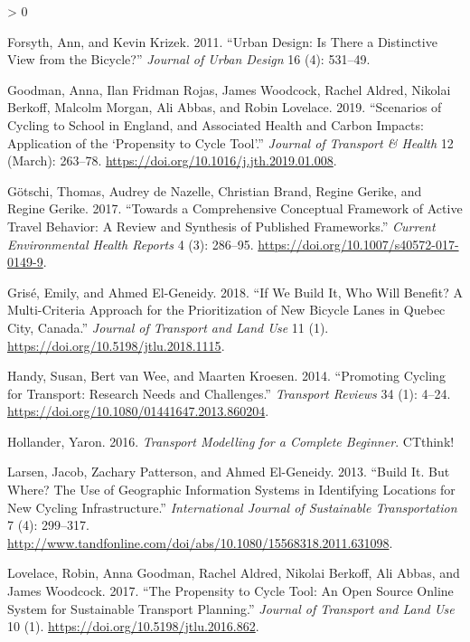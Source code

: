 \documentclass[galley]{jtlu-article-2col}
\newlength{\cslhangindent}
\newenvironment{CSLReferences}[2] %
 {%
  \setlength{\parindent}{0pt}
  \ifodd #1 \everypar{\setlength{\hangindent}{\cslhangindent}}\ignorespaces\fi
  \ifnum #2 > 0
  \setlength{\parskip}{#2\baselineskip}
  \fi
 }%
 {}
\begin{document}
\begin{CSLReferences}{1}{0}
\leavevmode\hypertarget{ref-forsyth_urban_2011}{}%
Forsyth, Ann, and Kevin Krizek. 2011. {``Urban Design: Is There a Distinctive View from the Bicycle?''} \emph{Journal of Urban Design} 16 (4): 531--49.

\leavevmode\hypertarget{ref-goodman_scenarios_2019}{}%
Goodman, Anna, Ilan Fridman Rojas, James Woodcock, Rachel Aldred, Nikolai Berkoff, Malcolm Morgan, Ali Abbas, and Robin Lovelace. 2019. {``Scenarios of Cycling to School in {England}, and Associated Health and Carbon Impacts: {Application} of the {`{Propensity} to {Cycle Tool}'}.''} \emph{Journal of Transport \& Health} 12 (March): 263--78. \url{https://doi.org/10.1016/j.jth.2019.01.008}.

\leavevmode\hypertarget{ref-gotschi_comprehensive_2017}{}%
Götschi, Thomas, Audrey de Nazelle, Christian Brand, Regine Gerike, and Regine Gerike. 2017. {``Towards a {Comprehensive Conceptual Framework} of {Active Travel Behavior}: A {Review} and {Synthesis} of {Published Frameworks}.''} \emph{Current Environmental Health Reports} 4 (3): 286--95. \url{https://doi.org/10.1007/s40572-017-0149-9}.

\leavevmode\hypertarget{ref-grise_if_2018}{}%
Grisé, Emily, and Ahmed El-Geneidy. 2018. {``If We Build It, Who Will Benefit? {A} Multi-Criteria Approach for the Prioritization of New Bicycle Lanes in {Quebec City}, {Canada}.''} \emph{Journal of Transport and Land Use} 11 (1). \url{https://doi.org/10.5198/jtlu.2018.1115}.

\leavevmode\hypertarget{ref-handy_promoting_2014}{}%
Handy, Susan, Bert van Wee, and Maarten Kroesen. 2014. {``Promoting {Cycling} for {Transport}: {Research Needs} and {Challenges}.''} \emph{Transport Reviews} 34 (1): 4--24. \url{https://doi.org/10.1080/01441647.2013.860204}.

\leavevmode\hypertarget{ref-hollander_transport_2016}{}%
Hollander, Yaron. 2016. \emph{Transport {Modelling} for a {Complete Beginner}}. {CTthink!}

\leavevmode\hypertarget{ref-larsen_build_2013}{}%
Larsen, Jacob, Zachary Patterson, and Ahmed El-Geneidy. 2013. {``Build It. {But} Where? {The} Use of Geographic Information Systems in Identifying Locations for New Cycling Infrastructure.''} \emph{International Journal of Sustainable Transportation} 7 (4): 299--317. \url{http://www.tandfonline.com/doi/abs/10.1080/15568318.2011.631098}.

\leavevmode\hypertarget{ref-lovelace_propensity_2017}{}%
Lovelace, Robin, Anna Goodman, Rachel Aldred, Nikolai Berkoff, Ali Abbas, and James Woodcock. 2017. {``The {Propensity} to {Cycle Tool}: {An} Open Source Online System for Sustainable Transport Planning.''} \emph{Journal of Transport and Land Use} 10 (1). \url{https://doi.org/10.5198/jtlu.2016.862}.


\end{CSLReferences}
\end{document}
